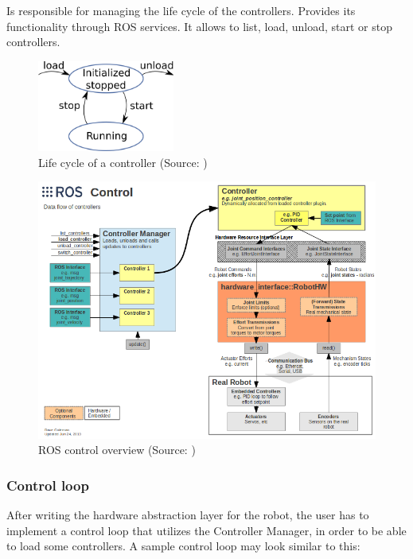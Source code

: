 \documentclass[english,inz,shortabstract]{iithesis}
\begin{document}
\begin{description}[style=nextline]
\begin{itemize}
            \end{itemize}
        \item [Controller Manager]
        Is responsible for managing the life cycle of the controllers. Provides its functionality through ROS services. It allows to list, load, unload, start or stop controllers. 
        \begin{figure}[ht]
            \centering
            \includegraphics[height=3cm]{img/controller_life.png}
            \caption{Life cycle of a controller (Source: \cite{ros_control:cm_wiki})}
            \label{fig:controller_life}
        \end{figure}

    \end{description}

    
    \begin{figure}[ht]
        \centering
        \includegraphics[width=\textwidth]{img/ros_control.png}
        \caption{ROS control overview (Source: \cite{ros_control:wiki})}
        \label{fig:ros_control}
    \end{figure}

    \subsubsection{Control loop}
    After writing the hardware abstraction layer for the robot, the user has to implement a control loop that utilizes the Controller Manager, in order to be able to load some controllers. A sample control loop may look similar to this:
\end{document}
